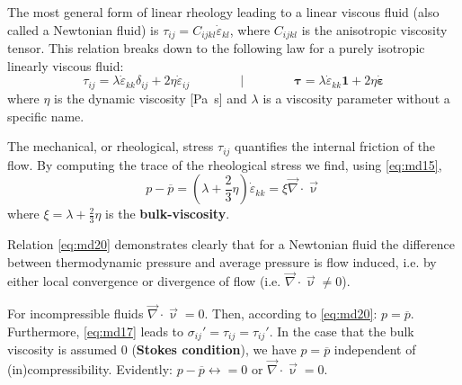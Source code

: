The most general form of linear rheology leading to a linear viscous
fluid (also called a Newtonian fluid) is $\tau_{ij}=C_{ijkl} \dot{\varepsilon}_{kl}$, 
where $C_{ijkl}$ is the anisotropic viscosity tensor. 
This relation breaks down to the following law for a purely isotropic
linearly viscous fluid:
\begin{equation}
\tau_{ij} = \lambda \dot{\varepsilon}_{kk} \delta_{ij} + 2 \eta  \dot{\varepsilon}_{ij}
\qquad
\qquad
\bigg\rvert
\qquad
\qquad
{\bm \tau} = \lambda \dot{\varepsilon}_{kk} {\bm 1} + 2 \eta  \dot{\bm\varepsilon}
\label{eq:md19}
\end{equation}
where $\eta$ is the dynamic viscosity [\si{\pascal\second}] and $\lambda$ is a viscosity
parameter without a specific name.

The mechanical, or rheological, stress $\tau_{ij}$ quantifies the internal friction of the flow. By
computing the trace of the rheological stress we find, using \eqref{eq:md15},
\begin{equation}
p - \overline{p} = \left(\lambda + \frac23 \eta \right) \dot{\varepsilon}_{kk} 
= \xi \vec\nabla\cdot\vec\upnu
\label{eq:md20}
\end{equation}
where $\xi=\lambda + \frac23 \eta$ is the {\bf bulk-viscosity}.

Relation \eqref{eq:md20} demonstrates clearly that for a Newtonian fluid the difference between
thermodynamic pressure and average pressure is flow induced, i.e. by either local
convergence or divergence of flow (i.e. $\vec\nabla\cdot \vec\upnu \neq 0$).

For incompressible fluids $\vec\nabla\cdot \vec\upnu = 0$. 
Then, according to \eqref{eq:md20}: $p = \overline{p}$. Furthermore, \eqref{eq:md17}
leads to $\sigma_{ij}'=\tau_{ij}=\tau_{ij}'$. In the case that the bulk viscosity 
is assumed 0 ({\bf Stokes condition}), we have $p = \overline{p}$ 
independent of (in)compressibility. Evidently: $p - \overline{p} \longleftrightarrow =0$
or $\vec\nabla \cdot \vec\upnu= 0$.

